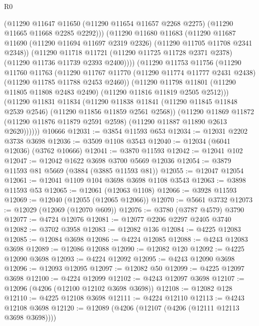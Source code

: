 \begin{lexlean}{R0}
\begin{coremodule}
            (@11290
              @11647
              @11650
              (@11290 @11654 @11657 @2268 @2275)
              (@11290 @11665 @11668 @2285 @2292)))
          (@11290
            @11680
            @11683
            (@11290
              @11687
              @11690
              (@11290 @11694 @11697 @2319 @2326)
              (@11290 @11705 @11708 @2341 @2348))
            (@11290
              @11718
              @11721
              (@11290 @11725 @11728 @2371 @2378)
              (@11290 @11736 @11739 @2393 @2400))))
        (@11290
          @11753
          @11756
          (@11290
            @11760
            @11763
            (@11290
              @11767
              @11770
              (@11290 @11774 @11777 @2431 @2438)
              (@11290 @11785 @11788 @2453 @2460))
            (@11290
              @11798
              @11801
              (@11290 @11805 @11808 @2483 @2490)
              (@11290 @11816 @11819 @2505 @2512)))
          (@11290
            @11831
            @11834
            (@11290
              @11838
              @11841
              (@11290 @11845 @11848 @2539 @2546)
              (@11290 @11856 @11859 @2561 @2568))
            (@11290
              @11869
              @11872
              (@11290 @11876 @11879 @2591 @2598)
              (@11290 @11887 @11890 @2613 @2620))))))
    @10666
@12031 := @3854 @11593 @653
@12034 := @12031 @2202 @3738 @3698
@12036 := @3509 @1108 @3543
@12040 := @12034 (@6041 @12036) (@3762 @10666)
@12041 := @3870 @11593
@12042 := @12041 @102
@12047 := @12042 @1622 @3698 @3700 @5669 @12036
@12054 := @3879 @11593 @81 @5669 (@3884 (@3885 @11593 @81))
@12055 := @12047 @12054
@12061 := @12041 @1109 @104 @3698 @3698 @1108 @3543
@12063 := @3898 @11593 @53
@12065 := @12061 (@12063 @1108)
@12066 := @3928 @11593
@12069 := @12040 (@12055 (@12065 @12066))
@12070 := @5661 @3732
@12073 := @12029 (@12069 (@12070 @609))
@12076 := @3780 (@3787 @4579) @3790
@12077 := @4724 @12076
@12081 := @12077 @2206 @2297 @2405 @3740
@12082 := @3702 @3958
@12083 := @12082 @136
@12084 := @4225 @12083
@12085 := @12084 @3698
@12086 := @4224 @12085
@12088 := @4243 @12083 @3698
@12089 := @12086 @12088
@12090 := @12082 @120
@12092 := @4225 @12090 @3698
@12093 := @4224 @12092
@12095 := @4243 @12090 @3698
@12096 := @12093 @12095
@12097 := @12082 @50
@12099 := @4225 @12097 @3698
@12100 := @4224 @12099
@12102 := @4243 @12097 @3698
@12107 := @12096 (@4206 (@12100 @12102 @3698 @3698))
@12108 := @12082 @128
@12110 := @4225 @12108 @3698
@12111 := @4224 @12110
@12113 := @4243 @12108 @3698
@12120 := @12089 (@4206 (@12107 (@4206 (@12111 @12113 @3698 @3698))))

\end{coremodule}
\end{lexlean}
